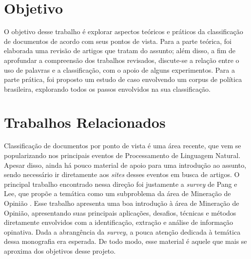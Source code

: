 


\section{Objetivo}
\label{objetivo}

O objetivo desse trabalho é explorar aspectos teóricos e práticos da classificação de documentos de acordo com seus pontos de vista. Para a parte teórica, foi elaborada uma revisão de artigos que tratam do assunto; além disso, a fim de aprofundar a compreensão dos trabalhos revisados, discute-se a relação entre o uso de palavras e a classificação, com o apoio de alguns experimentos. Para a parte prática, foi proposto um estudo de caso envolvendo um corpus de política brasileira, explorando todos os passos envolvidos na sua classificação.

\section{Trabalhos Relacionados}
\label{relacionados}

Classificação de documentos por ponto de vista é uma área recente, que vem se popularizando nos principais eventos de Processamento de Linguagem Natural. Apesar disso, ainda há pouco material de apoio para uma introdução ao assunto, sendo necessário ir diretamente aos \emph{sites} desses eventos em busca de artigos. O principal trabalho encontrado nessa direção foi justamente a \emph{survey} de Pang e Lee, que propõe a temática como um subproblema da área de Mineração de Opinião \cite{omsa}. Esse trabalho apresenta uma boa introdução à área de Mineração de Opinião, apresentando suas principais aplicações, desafios, técnicas e métodos diretamente envolvidos com a identificação, extração e análise de informação opinativa. Dada a abrangência da \emph{survey}, a pouca atenção dedicada à temática dessa monografia era esperada. De todo modo, esse material é aquele que mais se aproxima dos objetivos desse projeto.

